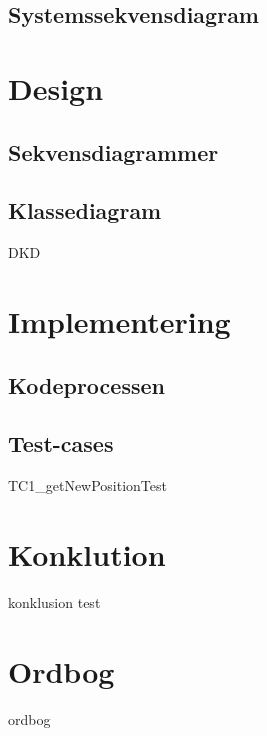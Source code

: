 \documentclass{article}
\begin{document}
{\subsection{Systemssekvensdiagram}

\newpage
\section{Design}

\subsection{Sekvensdiagrammer}

\newpage
\subsection{Klassediagram}
{DKD}

\section{Implementering}
\subsection{Kodeprocessen}

\subsection{Test-cases}
{TC1_getNewPositionTest}



\section{Konklution}
{konklusion}
test

\newpage
\section*{Ordbog}

{ordbog}




\newpage
\cleardoublepage
\printbibliography[heading=bibintoc]
}
\end{document}
